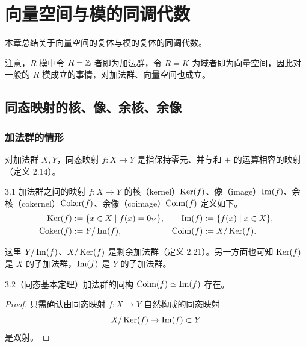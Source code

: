 \chapter{向量空间与模的同调代数}

本章总结关于向量空间的复体与模的复体的同调代数。

注意，$R$ 模中令 $R=\mathbb{Z}$ 者即为加法群，令 $R=K$ 为域者即为向量空间，因此对一般的 $R$ 模成立的事情，对加法群、向量空间也成立。

\section{同态映射的核、像、余核、余像}

\subsection{加法群的情形}

对加法群 $X,Y$，同态映射 $f\colon X\to Y$ 是指保持零元、并与和 $+$ 的运算相容的映射（定义 2.14）。

\begin{definition}{3.1}
加法群之间的映射 $f\colon X\to Y$ 的核（kernel）$\operatorname{Ker}(f)$、像（image）$\operatorname{Im}(f)$、余核（cokernel）$\operatorname{Coker}(f)$、余像（coimage）$\operatorname{Coim}(f)$ 定义如下。
\[
\begin{aligned}
\operatorname{Ker}(f) &:= \{x\in X \mid f(x)=0_Y\}, & \operatorname{Im}(f) &:= \{f(x)\mid x\in X\},\\
\operatorname{Coker}(f) &:= Y/\operatorname{Im}(f), & \operatorname{Coim}(f) &:= X/\operatorname{Ker}(f).
\end{aligned}
\]
\end{definition}

这里 $Y/\operatorname{Im}(f)$、$X/\operatorname{Ker}(f)$ 是剩余加法群（定义 2.21）。另一方面也可知 $\operatorname{Ker}(f)$ 是 $X$ 的子加法群，$\operatorname{Im}(f)$ 是 $Y$ 的子加法群。


\begin{lemma}{3.2}（同态基本定理）加法群的同构 $\operatorname{Coim}(f)\simeq \operatorname{Im}(f)$ 存在。
\end{lemma}

\begin{proof}
只需确认由同态映射 $f\colon X\to Y$ 自然构成的同态映射
\[
X/\operatorname{Ker}(f)\to \operatorname{Im}(f)\subset Y
\]
是双射。
\end{proof}

